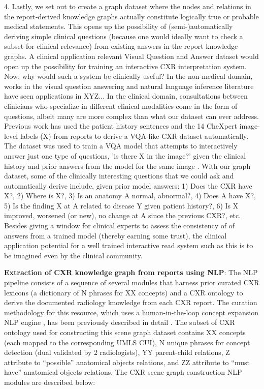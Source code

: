 4. Lastly, we set out to create a graph dataset where the nodes and relations in the report-derived knowledge graphs actually constitute logically true or probable medical statements. This opens up the possibility of (semi-)automatically deriving simple clinical questions (because one would ideally want to check a subset for clinical relevance) from existing answers in the report knowledge graphs. A clinical application relevant Visual Question and Answer dataset would open up the possibility for training an interactive CXR interpretation system. Now, why would such a system be clinically useful? 
In the non-medical domain, works in the visual question answering and natural language inference literature have seen applications in XYZ...  
In the clinical domain, consultations between clinicians who specialize in different clinical modalities come in the form of questions, albeit many are more complex than what our dataset can ever address. Previous work has used the patient history sentences and the 14 CheXpert image-level labels (X) from reports \cite{} to derive a VQA-like CXR dataset automatically. The dataset was used to train a VQA model that attempts to interactively answer just one type of questions, 'is there {X} in the image?' given the clinical history and prior answers from the model for the same image \cite{}. With our graph dataset, some of the clinically interesting questions that we could ask and automatically derive include, given {prior model answers}: 1) Does the CXR have {X}?, 2) Where is {X}?, 3) Is an anatomy {A} {normal, abnormal}?, 4) Does {A} have {X}?, 5) Is the finding {X} at {A} related to disease {Y} given {patient history}?, 6) Is {X} {improved, worsened (or new), no change} at {A} since the previous CXR?, etc. Besides giving a window for clinical experts to assess the consistency of of answers from a trained model (thereby earning some trust), the clinical application potential for a well trained interactive read system such as this is to be imagined even by the clinical community.


\textbf{Extraction of CXR knowledge graph from reports using NLP}:
The NLP pipeline consists of a sequence of several modules that harness prior curated CXR lexicons (a dictionary of N phrases for XX concepts) and a CXR ontology to derive the documented radiology knowledge from each CXR report. The curation methodology for this resource, which uses a human-in-the-loop concept expansion NLP engine \cite{}, has been previously described in detail \cite{}. The subset of CXR ontology used for constructing this scene graph dataset contains XX concepts (each mapped to the corresponding UMLS CUI), N unique phrases for concept detection (dual validated by 2 radiologists), YY parent-child relations, Z attribute to ``possible'' anatomical objects relations, and ZZ attribute to ``must have'' anatomical objects relations. The CXR scene graph construction NLP modules are described below:

